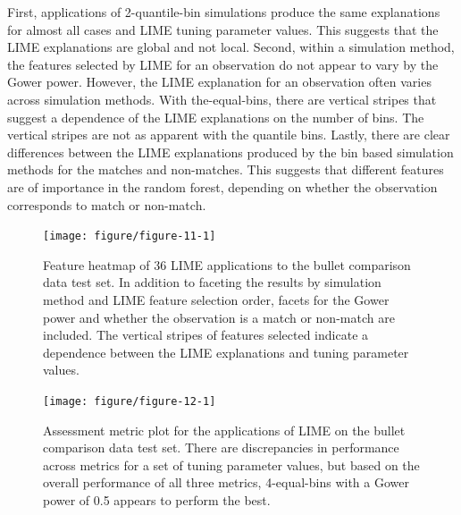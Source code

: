 \documentclass[AMS,STIX2COL]{WileyNJD-v2}\usepackage[]{graphicx}\usepackage[]{color}
\newenvironment{knitrout}{}{} %
\begin{document}
First, applications of 2-quantile-bin simulations produce the same explanations for almost all cases and LIME tuning parameter values. This suggests that the LIME explanations are global and not local. Second, within a simulation method, the features selected by LIME for an observation do not appear to vary by the Gower power. However, the LIME explanation for an observation often varies across simulation methods. With the-equal-bins, there are vertical stripes that suggest a dependence of the LIME explanations on the number of bins. The vertical stripes are not as apparent with the quantile bins. Lastly, there are clear differences between the LIME explanations produced by the bin based simulation methods for the matches and non-matches. This suggests that different features are of importance in the random forest, depending on whether the observation corresponds to match or non-match.

\begin{figure}[!thp]
\begin{knitrout}
\color{fgcolor}

{\centering \texttt{[image: figure/figure-11-1]} 

}



\end{knitrout}
\caption{Feature heatmap of 36 LIME applications to the bullet comparison data test set. In addition to faceting the results by simulation method and LIME feature selection order, facets for the Gower power and whether the observation is a match or non-match are included. The vertical stripes of features selected indicate a dependence between the LIME explanations and tuning parameter values.}
\label{fig:figure-11}

\vspace*{\floatsep}

\begin{knitrout}
\color{fgcolor}

{\centering \texttt{[image: figure/figure-12-1]} 

}



\end{knitrout}
\caption{Assessment metric plot for the applications of LIME on the bullet comparison data test set. There are discrepancies in performance across metrics for a set of tuning parameter values, but based on the overall performance of all three metrics, 4-equal-bins with a Gower power of 0.5 appears to perform the best.}
\label{fig:figure-12}
\end{figure}
\end{document}
